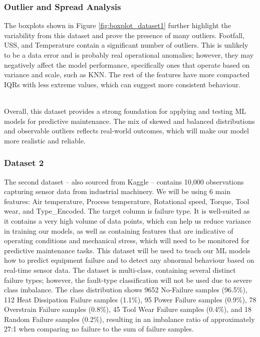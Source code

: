 \documentclass[11pt]{article}
\begin{document}
\subsubsection*{Outlier and Spread Analysis}
The boxplots shown in Figure \ref{fig:boxplot_dataset1} further highlight the variability from this dataset and prove the presence of many outliers. Footfall, USS, and Temperature contain a significant number of outliers. This is unlikely to be a data error and is probably real operational anomalies; however, they may negatively affect the model performance, specifically ones that operate based on variance and scale, such as KNN. The rest of the features have more compacted IQRs with less extreme values, which can suggest more consistent behaviour.\\\

Overall, this dataset provides a strong foundation for applying and testing ML models for predictive maintenance. The mix of skewed and balanced distributions and observable outliers reflects real-world outcomes, which will make our model more realistic and reliable.

\subsubsection{Dataset 2}
The second dataset – also sourced from Kaggle \cite{kaggle2023b} – contains 10,000 observations capturing sensor data from industrial machinery. We will be using 6 main features: Air temperature, Process temperature, Rotational speed, Torque, Tool wear, and Type\_Encoded. The target column is failure type. It is well-suited as it contains a very high volume of data points, which can help us reduce variance in training our models, as well as containing features that are indicative of operating conditions and mechanical stress, which will need to be monitored for predictive maintenance tasks. This dataset will be used to teach our ML models how to predict equipment failure and to detect any abnormal behaviour based on real-time sensor data. The dataset is multi-class, containing several distinct failure types; however, the fault-type classification will not be used due to severe class imbalance. The class distribution shows 9652 No-Failure samples (96.5\%), 112 Heat Dissipation Failure samples (1.1\%), 95 Power Failure samples (0.9\%), 78 Overstrain Failure samples (0.8\%), 45 Tool Wear Failure samples (0.4\%), and 18 Random Failure samples (0.2\%), resulting in an imbalance ratio of approximately 27:1 when comparing no failure to the sum of failure samples.
\end{document}
